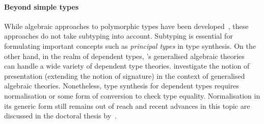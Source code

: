 
\paragraph{Beyond simple types}
While algebraic approaches to polymorphic types have been developed~\citep{Fiore2013,Hamana2011}, these approaches do not take subtyping into account.
Subtyping is essential for formulating important concepts such as \emph{principal types} in type synthesis.
On the other hand, in the realm of dependent types, \citeauthor{Cartmell1986}'s generalised algebraic theories~\citeyearpar{Cartmell1986} can handle a wide variety of dependent type theories.
\citet{Bezem2021} investigate the notion of presentation (extending the notion of signature) in the context of generalised algebraic theories.
Nonetheless, type synthesis for dependent types requires normalisation or some form of conversion to check type equality.
Normalisation in its generic form still remains out of reach and recent advances in this topic are discussed in the doctoral thesis by~\citet{Valliappan2023}.




